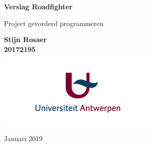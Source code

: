 \documentclass[12pt,a4paper]{article}
\begin{document}
\begin{titlepage}
   \begin{center}
       \vspace*{1cm}
 
       \textbf{{\huge Verslag Roadfighter}}
 
       \vspace{0.5cm}
        Project gevorderd programmeren
 
       \vspace{1.5cm}
 
       \textbf{{\Large Stijn Rosaer}\\20172195}
  
       \vspace{10cm}
 
       \includegraphics[scale=0.4]{img/logoua.jpg}

       Januari 2019
 
   \end{center}
\end{titlepage}
\newpage
\end{document}
